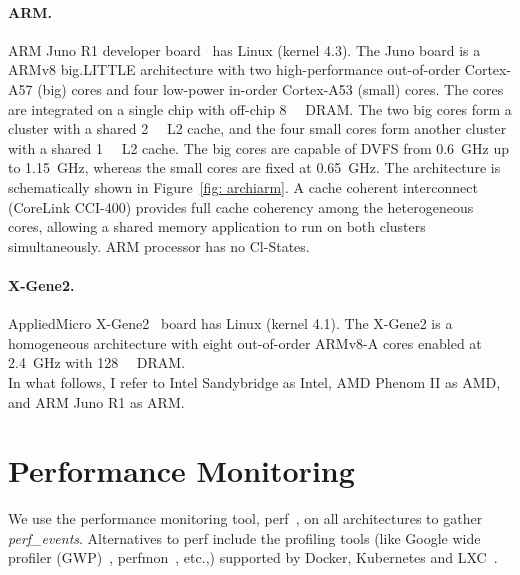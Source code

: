 \paragraph*{ARM.} ARM Juno R1 developer board~\citep{ARM} has Linux (kernel 4.3).  The
Juno board is a  ARMv8 big.LITTLE architecture with two high-performance
out-of-order Cortex-A57 (big) cores and four low-power in-order Cortex-A53 (small) cores.
The cores are integrated on a single chip with off-chip \SI{8}{\giga\byte} DRAM.  The two
big cores form a cluster with a shared \SI{2}{\mega\byte} L2 cache, and the four small
cores form another cluster with a shared \SI{1}{\mega\byte} L2 cache.  The big cores are
capable of DVFS from \SI{0.6}{\giga\hertz} up to \SI{1.15}{\giga\hertz}, whereas the small
cores are fixed at \SI{0.65}{\giga\hertz}. The architecture is schematically shown in
Figure~\ref{fig: archiarm}. A cache coherent interconnect (CoreLink CCI-400) provides full
cache coherency among the heterogeneous cores, allowing a shared memory application to run
on both clusters simultaneously. ARM processor has no Cl-States.
    
\paragraph*{X-Gene2.} AppliedMicro X-Gene2~\citep{AppliedXGene2http://goo.gl/XA04r1} board
has Linux (kernel 4.1).  The X-Gene2 is a  homogeneous architecture with
eight out-of-order ARMv8-A cores enabled at \SI{2.4}{\giga\hertz} with
\SI{128}{\giga\byte} DRAM.  \\


In what follows, I refer to Intel Sandybridge as Intel, AMD Phenom II as AMD, and ARM Juno
R1 as ARM.



\section{Performance Monitoring} 
\label{sec: perfmon thesis}


 We use the performance monitoring tool,
\textsf{perf}~\citep{2016Perf:Counters}, on all architectures to gather
\textit{perf\_events}. Alternatives to \textsf{perf} include the profiling
tools (like Google wide profiler (GWP)~\citep{Ren2010Google-WideCenters, Kanev:2015:PWC:2749469.2750392}, \textsf{perfmon}~\citep{perfmon2}, etc.,) supported by
Docker, Kubernetes and LXC~\citep{Bernstein2014ContainersKubernetes}.  

